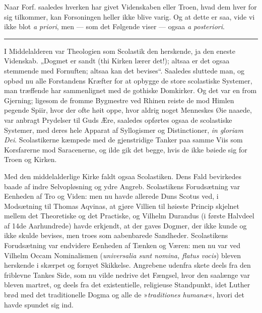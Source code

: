 \documentclass[12pt,a4paper]{book}
\newcommand{\opage}[1]{\marginnote{\footnotesize\textit{[#1]}}}
\begin{document}
Naar Forf. saaledes hverken har givet Videnskaben eller
Troen, hvad dem hver for sig tilkommer, kan Forsoningen
heller ikke blive varig. Og at dette er saa, vide vi ikke
blot \textit{a priori}, men --- som det Følgende viser --- ogsaa
\textit{a posteriori}.

\begin{center}\rule{4em}{0.4pt}\end{center}

\opage{12}\setcounter{footnote}{0}%
I Middelalderen var Theologien som Scolastik den herskende, ja den eneste
Videnskab. „Dogmet er sandt (thi Kirken lærer det!); altsaa er det ogsaa
stemmende med Fornuften; altsaa kan det bevises“. Saaledes sluttede man, og
opbød nu alle Forstandens Kræfter for at opbygge de store scolastiske
Systemer, man træffende har sammenlignet med de gothiske Domkirker. Og det
var en from Gjerning; ligesom de fromme Bygmestre ved Rhinen reiste de mod
Himlen pegende Spiir, hvor der ofte høit oppe, hvor aldrig noget Menneskes
Øie naaede, var anbragt Prydelser til Guds Ære, saaledes opførtes ogsaa de
scolastiske Systemer, med deres hele Apparat af Syllogismer og
Distinctioner, \textit{in gloriam Dei}. Scolastikerne kæmpede med de
gjenstridige Tanker paa samme Viis som Korsfarerne mod Saracenerne, og ilde
gik det begge, hvis de ikke bøiede sig for Troen og Kirken.

Med den middelalderlige Kirke faldt ogsaa Scolastiken. Dens Fald bevirkedes
baade af indre Selvopløsning og ydre Angreb. Scolastikens Forudsætning var
Eenheden af Tro og Viden: men nu havde allerede Duns Scotus ved, i
Modsætning til Thomas Aqvinas, at gjøre Villien til høieste Princip
skjelnet mellem det Theoretiske og det Practiske, og Vilhelm Durandus (i
første Halvdeel af 14de Aarhundrede) havde erkjendt, at der gaves Dogmer,
der ikke kunde og ikke skulde bevises, men troes som aabenbarede Sandheder.
Scolastikens Forudsætning var endvidere Eenheden af Tænken og Væren:
\opage{13}\setcounter{footnote}{0}%
men nu var ved Vilhelm Occam Nominalismen (\textit{universalia sunt nomina,
flatus vocis}) bleven herskende i skærpet og fornyet Skikkelse. Angrebene
udenfra skete deels fra den friblevne Tankes Side, som nu vilde nedrive det
Fængsel, hvor den saalænge var bleven martret, og deels fra det
existentielle, religieuse Standpunkt, idet Luther brød med det traditionelle
Dogma og alle de »\textit{traditiones humanæ}«, hvori det havde spundet sig
ind.
\end{document}
